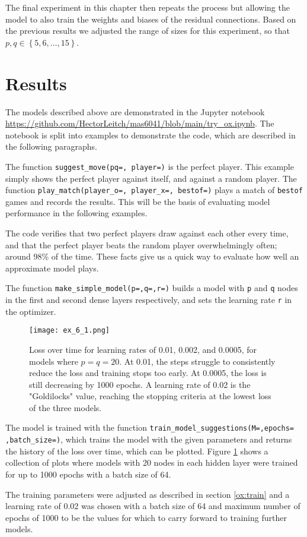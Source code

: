 \documentclass{somasmsc}
\begin{document}
The final experiment in this chapter then repeats the process but allowing the model to also train the weights and biases of the residual connections. Based on the previous results we adjusted the range of sizes for this experiment, so that $p,q \in \left\{5, 6, \dots, 15\right\}$.


\section{Results}

The models described above are demonstrated in the Jupyter notebook \url{https://github.com/HectorLeitch/mas6041/blob/main/try_ox.ipynb}. The notebook is split into examples to demonstrate the code, which are described in the following paragraphs.


\begin{exa}
The function \verb|suggest_move(pq=, player=)| is the perfect player. This example simply shows the perfect player against itself, and against a random player. The function \verb|play_match(player_o=, player_x=, bestof=)| plays a match of \verb|bestof| games and records the results. This will be the basis of evaluating model performance in the following examples.

The code verifies that two perfect players draw against each other every time, and that the perfect player beats the random player overwhelmingly often; around 98\% of the time. These facts give us a quick way to evaluate how well an approximate model plays.
\end{exa}

\begin{exa}
The function \verb|make_simple_model(p=,q=,r=)| builds a model with \verb|p| and \verb|q| nodes in the first and second dense layers respectively, and sets the learning rate \verb|r| in the optimizer.

\begin{figure}[H]\label{ox:ex_6_1}
\begin{center}
\texttt{[image: ex\_6\_1.png]}
\end{center}
\caption{Loss over time for learning rates of 0.01, 0.002, and 0.0005, for models where $p=q=20$. At 0.01, the steps struggle to consistently reduce the loss and training stops too early. At 0.0005, the loss is still decreasing by 1000 epochs. A learning rate of 0.02 is the "Goldilocks" value, reaching the stopping criteria at the lowest loss of the three models.}
\end{figure}

The model is trained with the function \verb|train_model_suggestions(M=,epochs=|
\verb|,batch_size=)|, which trains the model with the given parameters and returns the history of the loss over time, which can be plotted. Figure \ref{ox:ex_6_1} shows a collection of plots where models with 20 nodes in each hidden layer were trained for up to 1000 epochs with a batch size of 64.

The training parameters were adjusted as described in section \ref{ox:train} and a learning rate of 0.02 was chosen with a batch size of 64 and maximum number of epochs of 1000 to be the values for which to carry forward to training further models.
\end{exa}
\end{document}
